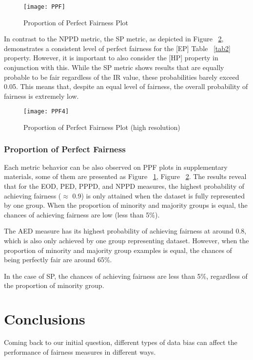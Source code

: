 \documentclass[sn-vancouver]{sn-jnl}%
\theoremstyle{thmstyleone}%
\theoremstyle{thmstyletwo}%
\theoremstyle{thmstylethree}%
\begin{document}
\begin{figure}[h]%
\centering
\texttt{[image: PPF]}
\caption{Proportion of Perfect Fairness Plot}\label{fig2}
\end{figure}

In contrast to the NPPD metric, the SP metric, as depicted in Figure ~\ref{fig3}, demonstrates a consistent level of perfect fairness for the [EP] Table ~\ref{tab2} property. However, it is important to also consider the [HP] property in conjunction with this. While the SP metric shows results that are equally probable to be fair regardless of the IR value, these probabilities barely exceed 0.05. This means that, despite an equal level of fairness, the overall probability of fairness is extremely low.

\begin{figure}[h]%
\centering
\texttt{[image: PPF4]}
\caption{Proportion of Perfect Fairness Plot (high resolution)}\label{fig3}
\end{figure}

\subsubsection{Proportion of Perfect Fairness}\label{subsubsec2}

Each metric behavior can be also observed on PPF plots in supplementary materials, some of them are presented as Figure ~\ref{fig2}, Figure ~\ref{fig3}. The results reveal that for the EOD, PED, PPPD, and NPPD measures, the highest probability of achieving fairness ($\approx$ 0.9) is only attained when the dataset is fully represented by one group. When the proportion of minority and majority groups is equal, the chances of achieving fairness are low (less than 5\%).

The AED measure has its highest probability of achieving fairness at around 0.8, which is also only achieved by one group representing dataset. However, when the proportion of minority and majority group examples is equal, the chances of being perfectly fair are around 65\%.

In the case of SP, the chances of achieving fairness are less than 5\%, regardless of the proportion of minority group.

\section{Conclusions}\label{sec5}

Coming back to our initial question, different types of data bias can affect the performance of fairness measures in different ways.
\end{document}

